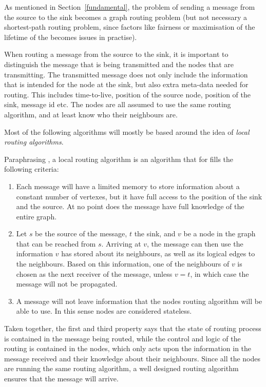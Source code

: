 \documentclass[letter, 12pt, english, draft]{article}
\begin{document}
As mentioned in Section~\ref{fundamental}, the problem of sending a message from the source to the sink  becomes a graph routing problem (but not necessary a shortest-path routing problem, since factors like fairness or maximisation of the lifetime of the \manet becomes issues in practise).

When routing a message from the source to the sink, it is important to distinguish the message that is being transmitted and the nodes that are transmitting. The transmitted message does not only include the information that is intended for the node at the sink, but also extra meta-data needed for routing. This includes time-to-live, position of the source node, position of the sink, message id etc. The nodes are all assumed to use the same routing algorithm, and at least know who their neighbours are.

Most of the following algorithms will mostly be based around the idea of \emph{local routing algorithms}. 

Paraphrasing \cite{compass}, a local routing algorithm is an algorithm that for fills the following criteria:
\begin{enumerate}
\item Each message will have a limited memory to store information about a constant number of vertexes, but it have full access to the position of the sink and the source. At no point does the message have full knowledge of the entire graph. 
\item Let $s$ be the source of the message, $t$ the sink, and $v$ be a node in the graph that can be reached from $s$. Arriving at $v$, the message can then use the information $v$ has stored about its neighbours, as well as its logical edges to the neighbours. Based on this information, one of the neighbours of $v$ is chosen as the next receiver of the message, unless $v = t$, in which case the message will not be propagated.
\item A message will not leave information that the nodes routing algorithm will be able to use. In this sense nodes are considered stateless.\end{enumerate}

Taken together, the first and third property says that the state of routing process is contained in the message being routed, while the control and logic of the routing is contained in the nodes, which only acts upon the information in the message received and their knowledge about their neighbours. Since all the nodes are running the same routing algorithm, a well designed routing algorithm ensures that the message will arrive.
\end{document}

